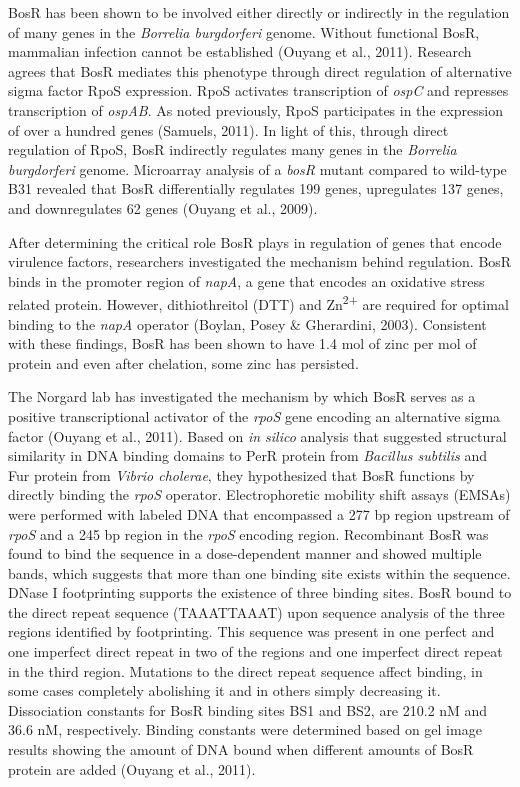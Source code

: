 \documentclass[12pt,twoside]{reedthesis}
\begin{document}
		
		BosR has been shown to be involved either directly or indirectly in the regulation of many genes in the \textit{Borrelia burgdorferi} genome. Without functional BosR, mammalian infection cannot be established (Ouyang et al., 2011). Research agrees that BosR mediates this phenotype through direct regulation of alternative sigma factor RpoS expression. RpoS activates transcription of \textit{ospC} and represses transcription of \textit{ospAB}. As noted previously, RpoS  participates in the expression of over a hundred genes (Samuels, 2011). In light of this, through direct regulation of RpoS, BosR indirectly regulates many genes in the \textit{Borrelia burgdorferi} genome. Microarray analysis of a \textit{bosR} mutant compared to wild-type B31 revealed that BosR differentially regulates 199 genes, upregulates 137 genes, and downregulates 62 genes (Ouyang et al., 2009).  
		
		
		
		
		After determining the critical role BosR plays in regulation of genes that encode virulence factors, researchers investigated the mechanism behind regulation.  BosR binds in the promoter region of \textit{napA}, a gene that encodes an oxidative stress related protein. However, dithiothreitol (DTT) and Zn\textsuperscript{2+} are required  for optimal binding to the \textit{napA} operator (Boylan, Posey \& Gherardini, 2003). Consistent with these findings, BosR has been shown to have 1.4 mol of zinc per mol of protein and even after chelation, some zinc has persisted.
		
		
		
	The Norgard lab has investigated the mechanism by which BosR serves as a positive transcriptional activator of the \textit{rpoS} gene encoding an alternative sigma factor (Ouyang et al., 2011). Based on \textit{in silico} analysis that suggested structural similarity in DNA binding domains to PerR protein from \textit{Bacillus subtilis} and Fur protein from \textit{Vibrio cholerae}, they hypothesized that BosR functions by directly binding the \textit{rpoS} operator. Electrophoretic mobility shift assays (EMSAs) were performed with labeled DNA that encompassed a 277 bp region upstream of \textit{rpoS} and a 245 bp region in the \textit{rpoS} encoding region. Recombinant BosR was found to bind the sequence in a dose-dependent manner and showed multiple bands, which suggests that more than one binding site exists within the sequence. DNase I footprinting supports the existence of three binding sites. BosR bound to the direct repeat sequence \-(TAAATTAAAT) upon sequence analysis of the three regions identified by footprinting. This sequence was present in one perfect and one imperfect direct repeat in two of the regions and one imperfect direct repeat in the third region. Mutations to the direct repeat sequence affect binding, in some cases completely abolishing it and in others simply decreasing it.  Dissociation constants for BosR binding sites BS1 and BS2, are 210.2 nM and 36.6 nM, respectively. Binding constants were determined  based on gel image results showing the amount of DNA bound when different amounts of BosR protein are added (Ouyang et al., 2011).
		
\end{document}
